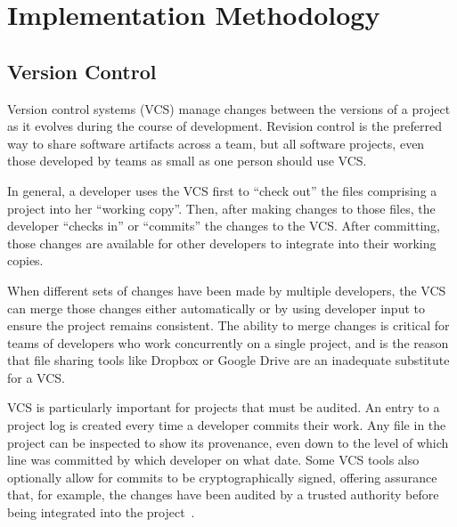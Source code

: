 
\section{Implementation Methodology}





\subsection{Version Control}

Version control systems (VCS) manage changes between the versions of a
project as it evolves during the course of development. Revision
control is the preferred way to share software artifacts across a
team, but all software projects, even those developed by teams as
small as one person should use VCS.

In general, a developer uses the VCS first to ``check out'' the files
comprising a project into her ``working copy''. Then, after making
changes to those files, the developer ``checks in'' or ``commits'' the
changes to the VCS. After committing, those changes are available for
other developers to integrate into their working copies.

When different sets of changes have been made by multiple developers,
the VCS can merge those changes either automatically or by using
developer input to ensure the project remains consistent. The ability
to merge changes is critical for teams of developers who work
concurrently on a single project, and is the reason that file sharing
tools like Dropbox or Google Drive are an inadequate substitute for a
VCS.

VCS is particularly important for projects that must be audited. An
entry to a project log is created every time a developer commits their
work. Any file in the project can be inspected to show its provenance,
even down to the level of which line was committed by which developer
on what date. Some VCS tools also optionally allow for commits to be
cryptographically signed, offering assurance that, for example, the
changes have been audited by a trusted authority before being
integrated into the project~\cite{chacon2014pro}.


